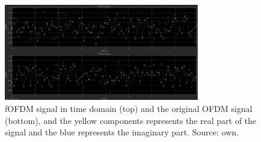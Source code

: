 \begin{figure}[h]
\begin{center}
\includegraphics[width=8.5cm]{images/time.png}
\caption{fOFDM signal in time domain (top) and the original OFDM signal (bottom), and the yellow components represents the real part of the signal and the blue represents the imaginary part. Source: own.}
\label{fig:time} 
\end{center}
\end{figure}